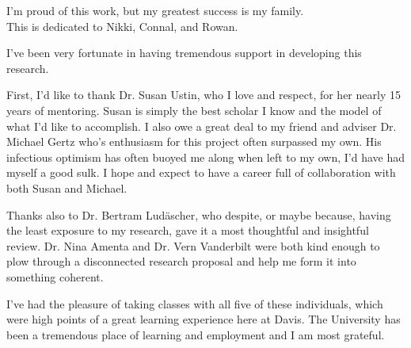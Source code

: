 \documentclass{ucdthesis}       %
\begin{document}
\acresetall
\newsavebox{\gsfoo}

\begin{frontmatter}

\maketitle


\clearpage
\begin{dedication}
  \vspace*{\fill}
  \begin{center}
    { I'm proud of this work, but my greatest success is my family.\\
      This is dedicated to Nikki, Connal, and Rowan.
    }
  \end{center}
  \vspace*{\fill}
\end{dedication}

\clearpage
\begin{acknowledgments}

  I've been very fortunate in having tremendous support in developing
  this research. 

  First, I'd like to thank Dr. Susan Ustin, who I love and respect,
  for her nearly 15 years of mentoring.  Susan is simply the best
  scholar I know and the model of what I'd like to accomplish.  I also
  owe a great deal to my friend and adviser Dr. Michael Gertz who's
  enthusiasm for this project often surpassed my own.  His infectious
  optimism has often buoyed me along when left to my own, I'd have had
  myself a good sulk.  I hope and expect to have a career full of
  collaboration with both Susan and Michael.

  Thanks also to Dr. Bertram Lud\"ascher, who despite, or maybe
  because, having the least exposure to my research, gave it a most
  thoughtful and insightful review.  Dr. Nina Amenta and Dr. Vern
  Vanderbilt were both kind enough to plow through a disconnected
  research proposal and help me form it into something coherent.

  I've had the pleasure of taking classes with all five of these
  individuals, which were high points of a great learning experience
  here at Davis.  The University has been a tremendous place of
  learning and employment and I am most grateful.


\end{acknowledgments}
\end{frontmatter}
\end{document}
